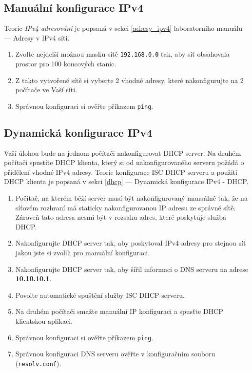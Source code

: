 \subsection{Manuální konfigurace IPv4}

Teorie \emph{IPv4 adresování} je popsaná v sekci \ref{adresy_ipv4} laboratorního manuálu --- Adresy v IPv4 síti.

\begin{enumerate}
    \item Zvolte nejdelší možnou masku sítě \texttt{192.168.0.0} tak, aby síť obsahovala prostor pro 100 koncových stanic.
    \item Z takto vytvořené sítě si vyberte 2 vhodné adresy, které nakonfigurujte na 2 počítače ve Vaší síti.
    \item Správnou konfiguraci si ověřte příkazem {\tt ping}.
\end{enumerate}

\subsection{Dynamická konfigurace IPv4}

Vaší úlohou bude na jednom počítači nakonfigurovat DHCP server.
Na druhém počítači spustíte DHCP klienta, který si od nakonfigurovaného serveru požádá o přidělení vhodné IPv4 adresy.
Teorie konfigurace ISC DHCP serveru a použití DHCP klienta je popsaná v sekci \ref{dhcp} --- Dynamická konfigurace IPv4 - DHCP.

\begin{enumerate}
    \item Počítač, na kterém běží server musí být nakonfigurovaný manuálně tak, že na síťovém rozhraní má staticky nakonfigurovanou IP adresu ze správné sítě.
      Zároveň tato adresa nesmí být v rozsahu adres, které poskytuje služba DHCP.
    \item Nakonfigurujte DHCP server tak, aby poskytoval IPv4 adresy pro stejnou síť jakou jste si zvolili pro manuální konfiguraci.
    \item Nakonfigurujte DHCP server tak, aby šířil informaci o DNS serveru na adrese {\bf 10.10.10.1}.
    \item Povolte automatické spuštění služby ISC DHCP serveru.
    \item Na druhém počítači smažte manuální IP konfiguraci a spusťte DHCP klientskou aplikaci.
    \item Správnou konfiguraci si ověřte příkazem {\tt ping}.
    \item Správnou konfiguraci DNS serveru ověřte v konfiguračním souboru (\texttt{resolv.conf}).
\end{enumerate}


